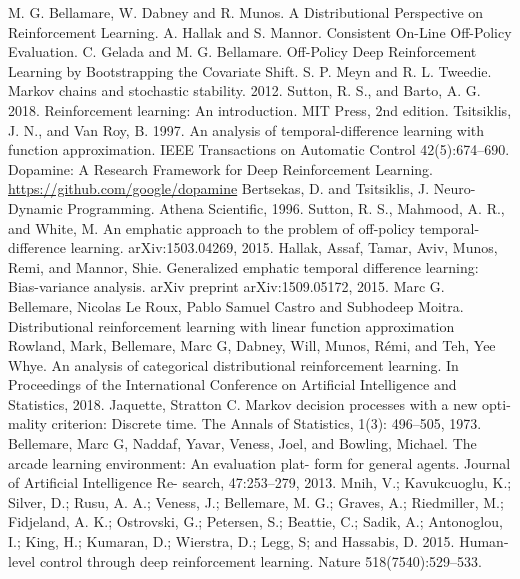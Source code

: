 \documentclass[12pt,a4paper,openright,twoside]{article}
\numberwithin{equation}{section}
\theoremstyle{definition}
\theoremstyle{remark}
\theoremstyle{plain}
\begin{document}
\thispagestyle{plain}
\begin{thebibliography}{50}

	 M. G. Bellamare, W. Dabney and R. Munos. A Distributional Perspective on Reinforcement Learning.
	 A. Hallak and S. Mannor. Consistent On-Line Off-Policy Evaluation.
	 C. Gelada and M. G. Bellamare. Off-Policy Deep Reinforcement Learning by Bootstrapping the Covariate Shift.
	  S. P. Meyn and R. L. Tweedie. Markov chains and stochastic stability. 2012.
	 Sutton, R. S., and Barto, A. G. 2018. Reinforcement learning: An introduction. MIT Press, 2nd edition.
	 Tsitsiklis, J. N., and Van Roy, B. 1997. An analysis of temporal-difference learning with function approximation. IEEE Transactions on Automatic Control 42(5):674–690.
	 Dopamine: {A} Research Framework for Deep Reinforcement Learning. \url{https://github.com/google/dopamine}
	 Bertsekas, D. and Tsitsiklis, J. Neuro-Dynamic Programming. Athena Scientific, 1996.
	 Sutton, R. S., Mahmood, A. R., and White, M. An emphatic approach to the problem of off-policy temporal- difference learning. arXiv:1503.04269, 2015.
	 Hallak, Assaf, Tamar, Aviv, Munos, Remi, and Mannor, Shie. Generalized emphatic temporal difference learning: Bias-variance analysis. arXiv preprint arXiv:1509.05172, 2015.
	 Marc G. Bellemare, Nicolas Le Roux, Pablo Samuel Castro and Subhodeep Moitra. Distributional reinforcement learning with linear function approximation
	 Rowland, Mark, Bellemare, Marc G, Dabney, Will, Munos, Rémi, and Teh, Yee Whye. An analysis of categorical distributional reinforcement learning. In Proceedings of the International Conference on Artificial Intelligence and Statistics, 2018.
	 Jaquette, Stratton C. Markov decision processes with a new opti- mality criterion: Discrete time. The Annals of Statistics, 1(3): 496–505, 1973.
	 Bellemare, Marc G, Naddaf, Yavar, Veness, Joel, and Bowling, Michael. The arcade learning environment: An evaluation plat- form for general agents. Journal of Artificial Intelligence Re- search, 47:253–279, 2013.
	 Mnih, V.; Kavukcuoglu, K.; Silver, D.; Rusu, A. A.; Veness, J.; Bellemare, M. G.; Graves, A.; Riedmiller, M.; Fidjeland, A. K.; Ostrovski, G.; Petersen, S.; Beattie, C.; Sadik, A.; Antonoglou, I.; King, H.; Kumaran, D.; Wierstra, D.; Legg, S; and Hassabis, D. 2015. Human-level control through deep reinforcement learning. Nature 518(7540):529–533.

\end{thebibliography}
\end{document}
